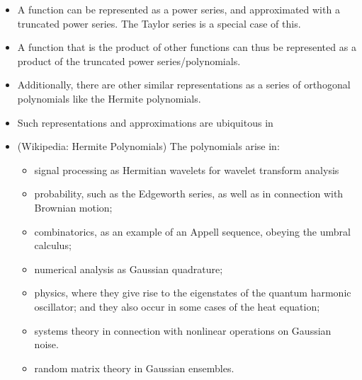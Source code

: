 \documentclass{article}
\renewcommand{\_}{\ifincsname_\else\legacyunderscore\fi}
\begin{document}
        \begin{itemize}
            \item A function can be represented as a power series, and approximated with a truncated power series.  The Taylor series is a special case of this.
            \item A function that is the product of other functions can thus be represented as a product of the truncated power series/polynomials.
            \item Additionally, there are other similar representations as a series of orthogonal polynomials like the Hermite polynomials.
            \item Such representations and approximations are ubiquitous in
            \item (Wikipedia: Hermite Polynomials) The polynomials arise in:
                \begin{itemize}
                    \item signal processing as Hermitian wavelets for wavelet transform analysis
                    \item probability, such as the Edgeworth series, as well as in connection with Brownian motion;
                    \item combinatorics, as an example of an Appell sequence, obeying the umbral calculus;
                    \item numerical analysis as Gaussian quadrature;
                    \item physics, where they give rise to the eigenstates of the quantum harmonic oscillator; and they also occur in some cases of the heat equation;
                    \item systems theory in connection with nonlinear operations on Gaussian noise.
                    \item random matrix theory in Gaussian ensembles.
                \end{itemize}
        \end{itemize}

\printbibliography
\end{document}
